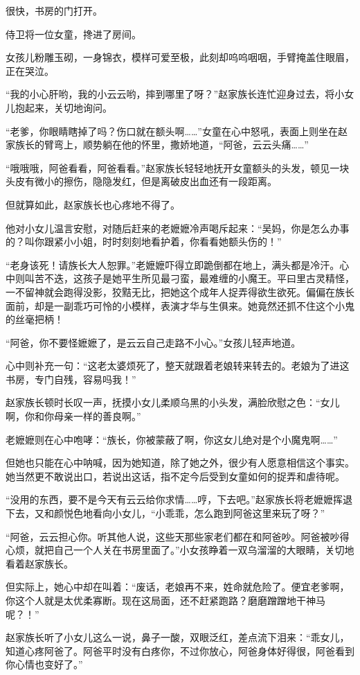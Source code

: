 \begin{this_body}
很快，书房的门打开。

侍卫将一位女童，搀进了房间。

女孩儿粉雕玉砌，一身锦衣，模样可爱至极，此刻却呜呜咽咽，手臂掩盖住眼眉，正在哭泣。

“我的小心肝哟，我的小云云哟，摔到哪里了呀？”赵家族长连忙迎身过去，将小女儿抱起来，关切地询问。

“老爹，你眼睛瞎掉了吗？伤口就在额头啊……”女童在心中怒吼，表面上则坐在赵家族长的臂弯上，顺势躺在他的怀里，撒娇地道，“阿爸，云云头痛……”

“哦哦哦，阿爸看看，阿爸看看。”赵家族长轻轻地抚开女童额头的头发，顿见一块头皮有微小的擦伤，隐隐发红，但是离破皮出血还有一段距离。

但就算如此，赵家族长也心疼地不得了。

他对小女儿温言安慰，对随后赶来的老嬷嬷冷声喝斥起来：“吴妈，你是怎么办事的？叫你跟紧小小姐，时时刻刻地看护着，你看看她额头伤的！”

“老身该死！请族长大人恕罪。”老嬷嬷吓得立即跪倒都在地上，满头都是冷汗。心中则叫苦不迭，这孩子是她平生所见最刁蛮，最难缠的小魔王。平曰里古灵精怪，一不留神就会跑得没影，狡黠无比，把她这个成年人捉弄得欲生欲死。偏偏在族长面前，却是一副乖巧可怜的小模样，表演才华与生俱来。她竟然还抓不住这个小鬼的丝毫把柄！

“阿爸，你不要怪嬷嬷了，是云云自己走路不小心。”女孩儿轻声地道。

心中则补充一句：“这老太婆烦死了，整天就跟着老娘转来转去的。老娘为了进这书房，专门自残，容易吗我！”

赵家族长顿时长叹一声，抚摸小女儿柔顺乌黑的小头发，满脸欣慰之色：“女儿啊，你和你母亲一样的善良啊。”

老嬷嬷则在心中咆哮：“族长，你被蒙蔽了啊，你这女儿绝对是个小魔鬼啊……”

但她也只能在心中呐喊，因为她知道，除了她之外，很少有人愿意相信这个事实。她当然更不敢说出口，若说出这话，指不定今后受到女童如何的捉弄和虐待呢。

“没用的东西，要不是今天有云云给你求情……哼，下去吧。”赵家族长将老嬷嬷挥退下去，又和颜悦色地看向小女儿，“小乖乖，怎么跑到阿爸这里来玩了呀？”

“阿爸，云云担心你。听其他人说，这些天那些家老们都在和阿爸吵。阿爸被吵得心烦，就把自己一个人关在书房里面了。”小女孩睁着一双乌溜溜的大眼睛，关切地看着赵家族长。

但实际上，她心中却在叫着：“废话，老娘再不来，姓命就危险了。便宜老爹啊，你这个人就是太优柔寡断。现在这局面，还不赶紧跑路？磨磨蹭蹭地干神马呢？！”

赵家族长听了小女儿这么一说，鼻子一酸，双眼泛红，差点流下泪来：“乖女儿，知道心疼阿爸了。阿爸平时没有白疼你，不过你放心，阿爸身体好得很，阿爸看到你心情也变好了。”


\end{this_body}
